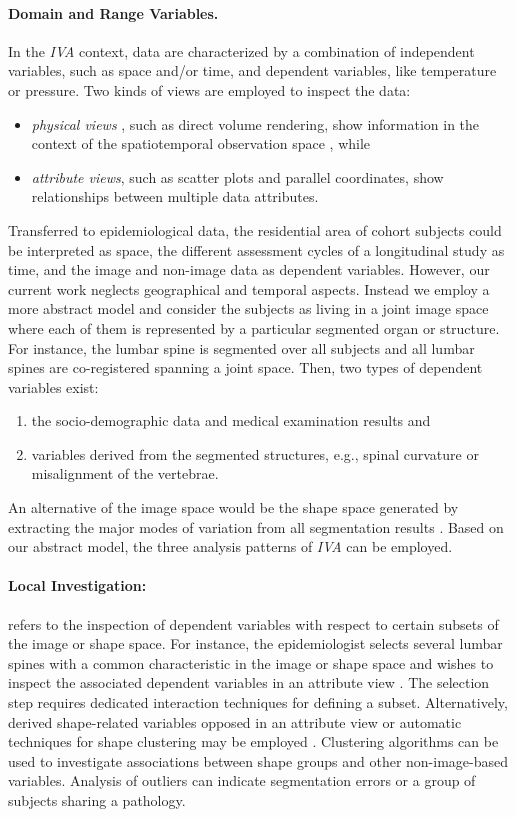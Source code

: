 \documentclass[journal]{style/vgtc} 			          %
\begin{document}
\paragraph{Domain and Range Variables. }
In the \emph{IVA} context, data are characterized by a combination of independent variables, such as space and/or time, and dependent variables, like temperature or pressure.
%
Two kinds of views are employed to inspect the data:
\begin{itemize} 
	\item \emph{physical views} \cite{Oeltze2013}, such as direct volume rendering, show information in the context of the spatiotemporal observation space \cite{Oeltze2007}, while
	\item \emph{attribute views}, such as scatter plots and parallel coordinates, show relationships between multiple data attributes.
\end{itemize}
Transferred to epidemiological data, the residential area of cohort subjects could be interpreted as space, the different assessment cycles of a longitudinal study as time, and the image and non-image data as dependent variables.
%
However, our current work neglects geographical and temporal aspects.
%
Instead we employ a more abstract model and consider the subjects as living in a joint image space where each of them is represented by a particular segmented organ or structure.
%
For instance, the lumbar spine is segmented over all subjects and all lumbar spines are co-registered spanning a joint space.
%
Then, two types of dependent variables exist: 
\begin{enumerate}
	\item the socio-demographic data and medical examination results and 
	\item variables derived from the segmented structures, e.g., spinal curvature or misalignment of the vertebrae.
\end{enumerate}
An alternative of the image space would be the shape space generated by extracting the major modes of variation from all segmentation results \cite{Busking2010a}.
%
Based on our abstract model, the three analysis patterns of \emph{IVA} can be employed.

\paragraph{Local Investigation:} refers to the inspection of dependent variables with respect to certain subsets of the image or shape space.
%
For instance, the epidemiologist selects several lumbar spines with a common characteristic in the image or shape space and wishes to inspect the associated dependent variables in an attribute view \cite{Hermann2014}.
%
The selection step requires dedicated interaction techniques for defining a subset.
%
Alternatively, derived shape-related variables opposed in an attribute view or automatic techniques for shape clustering may be employed \cite{Klemm2013VMV}.
%
Clustering algorithms can be used to investigate associations between shape groups and other non-image-based variables.
%
Analysis of outliers can indicate segmentation errors or a group of subjects sharing a pathology.
\end{document}
